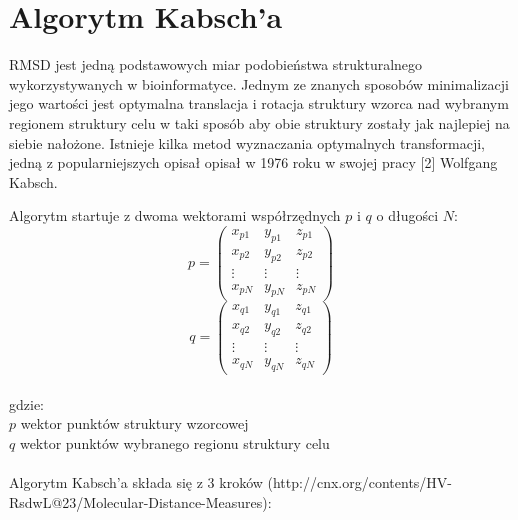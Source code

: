 \documentclass[licencjacka]{pracamgr}
\begin{document}
\section{Algorytm Kabsch'a}
RMSD jest jedną podstawowych miar podobieństwa strukturalnego wykorzystywanych w bioinformatyce. Jednym ze znanych sposobów minimalizacji jego wartości jest optymalna translacja i rotacja struktury wzorca nad wybranym regionem struktury celu w taki sposób aby obie struktury zostały jak najlepiej na siebie nałożone. Istnieje kilka metod wyznaczania optymalnych transformacji, jedną z popularniejszych opisał opisał w 1976 roku w swojej pracy [2] Wolfgang Kabsch.

Algorytm startuje z dwoma wektorami współrzędnych $p$ i $q$ o długości $N$:
$$
p=
\begin{pmatrix}
 x_{p1} & y_{p1} & z_{p1} \\
 x_{p2} & y_{p2} & z_{p2} \\
 \vdots & \vdots & \vdots \\
 x_{pN} & y_{pN} & z_{pN}
\end{pmatrix}
$$
$$
q= 
\begin{pmatrix}
 x_{q1} & y_{q1} & z_{q1} \\
 x_{q2} & y_{q2} & z_{q2} \\
 \vdots & \vdots & \vdots \\
 x_{qN} & y_{qN} & z_{qN}
\end{pmatrix}
$$
\\
gdzie:
\\
$p$ wektor punktów struktury wzorcowej
\\
$q$ wektor punktów wybranego regionu struktury celu
\\
\\
Algorytm Kabsch'a składa się z 3 kroków (http://cnx.org/contents/HV-RsdwL@23/Molecular-Distance-Measures):
\end{document}
